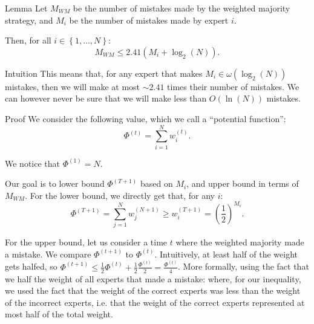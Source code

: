\documentclass[a4paper]{article}
\begin{document}
\begin{parag}{Lemma}
    Let $M_{WM}$ be the number of mistakes made by the weighted majority strategy, and $M_i$ be the number of mistakes made by expert $i$. 

    Then, for all $i \in \left\{1, \ldots, N\right\}$: 
    \[M_{WM} \leq 2.41 \left(M_i + \log_2\left(N\right)\right).\]

    \begin{subparag}{Intuition}
        This means that, for any expert that makes $M_i \in \omega\left(\log_2\left(N\right)\right)$ mistakes, then we will make at most $\sim 2.41$ times their number of mistakes. We can however never be sure that we will make less than $O\left(\ln\left(N\right)\right)$ mistakes.
    \end{subparag}

    \begin{subparag}{Proof}
        We consider the following value, which we call a ``potential function'':
        \[\Phi^{\left(t\right)} = \sum_{i=1}^{N} w_i^{\left(t\right)}.\]

        We notice that $\Phi^{\left(1\right)} = N$. 

        Our goal is to lower bound $\Phi^{\left(T+1\right)}$ based on $M_i$, and upper bound in terms of $M_{WM}$. For the lower bound, we directly get that, for any $i$:
        \[\Phi^{\left(T+1\right)} = \sum_{j=1}^{N} w_j^{\left(N+1\right)} \geq w_i^{\left(T+1\right)} = \left(\frac{1}{2}\right)^{M_i}.\]

    For the upper bound, let us consider a time $t$ where the weighted majority made a mistake. We compare $\Phi^{\left(t+1\right)}$ to $\Phi^{\left(t\right)}$. Intuitively, at least half of the weight gets halfed, so $\Phi^{\left(t+1\right)} \leq \frac{1}{2}\Phi^{\left(t\right)} + \frac{1}{2} \frac{\Phi^{\left(t\right)}}{2} = \frac{\Phi^{\left(t\right)}}{4}$. More formally, using the fact that we half the weight of all experts that made a mistake: 
        where, for our inequality, we used the fact that the weight of the correct experts was less than the weight of the incorrect experts, i.e. that the weight of the correct experts represented at most half of the total weight.


\end{subparag}
\end{parag}
\end{document}
